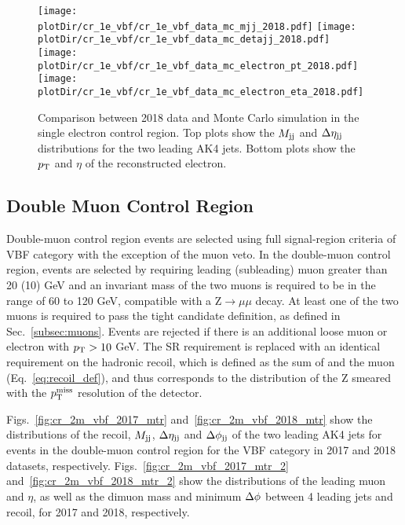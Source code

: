 \begin{figure}[htbp]
    \begin{center}
        \texttt{[image: \\plotDir/cr\_1e\_vbf/cr\_1e\_vbf\_data\_mc\_mjj\_2018.pdf]}
        \texttt{[image: \\plotDir/cr\_1e\_vbf/cr\_1e\_vbf\_data\_mc\_detajj\_2018.pdf]} \\
        \texttt{[image: \\plotDir/cr\_1e\_vbf/cr\_1e\_vbf\_data\_mc\_electron\_pt\_2018.pdf]}
        \texttt{[image: \\plotDir/cr\_1e\_vbf/cr\_1e\_vbf\_data\_mc\_electron\_eta\_2018.pdf]}
    \end{center}
    \caption{Comparison between 2018 data and Monte Carlo simulation in the single electron control region. Top plots
    show the $M_{\textrm{jj}}$ and $\Delta \eta_{\textrm{jj}}$ distributions for the two leading AK4 jets. Bottom plots show the $p_{\textrm{T}}$ and $\eta$
    of the reconstructed electron.}
    \label{fig:cr_1e_vbf_2018_mtr}
\end{figure}

\clearpage

\subsection{Double Muon Control Region}
\label{sec:selection_cr_2m}

Double-muon control region events are selected using full signal-region criteria of VBF category with the exception of the muon veto. 
In the double-muon control region, events are selected by requiring leading (subleading) muon \pt greater than 20 (10) GeV and 
an invariant mass of the two muons is required to be in the range of 60 to 120 GeV, compatible with a $\textrm{Z} \rightarrow \mu \mu$ decay. 
At least one of the two muons is required to 
pass the tight candidate definition, as defined in Sec.~\ref{subsec:muons}. 
Events are rejected if there is an additional loose muon or electron with $p_{\textrm{T}} > 10$ GeV. 
The SR \ptmiss requirement is replaced with an identical requirement on the hadronic recoil, 
which is defined as the sum of \ptvecmiss 
and the muon \vpt (Eq.~\ref{eq:recoil_def}), and thus corresponds to the distribution of the Z \pt smeared
with the $p_{\textrm{T}}^{\textrm{miss}}$ resolution of the detector.

Figs.~\ref{fig:cr_2m_vbf_2017_mtr} and~\ref{fig:cr_2m_vbf_2018_mtr} show the distributions of the recoil, $M_{\textrm{jj}}$, $\Delta \eta_{\textrm{jj}}$ and  
$\Delta \phi_{\textrm{jj}}$ of the two leading AK4 jets for events in the double-muon control region for the VBF category 
in 2017 and 2018 datasets, respectively. Figs.~\ref{fig:cr_2m_vbf_2017_mtr_2} and~\ref{fig:cr_2m_vbf_2018_mtr_2} show the distributions 
of the leading muon \pt and $\eta$, as well as the dimuon mass and minimum $\Delta \phi$ between 4 leading jets and recoil, for 2017 and 2018, respectively.

